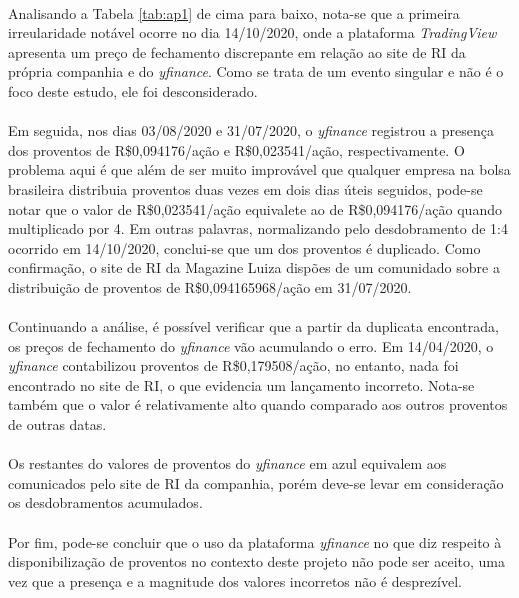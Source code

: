 \paragraph{} Analisando a Tabela \ref{tab:ap1} de cima para baixo, nota-se que a primeira irreularidade notável ocorre no dia 14/10/2020, onde a plataforma \textit{TradingView} apresenta um preço de fechamento discrepante em relação ao site de RI da própria companhia e do \textit{yfinance}. Como se trata de um evento singular e não é o foco deste estudo, ele foi desconsiderado.

\paragraph{} Em seguida, nos dias 03/08/2020 e 31/07/2020, o \textit{yfinance} registrou a presença dos proventos de R\$0,094176/ação e R\$0,023541/ação, respectivamente. O problema aqui é que além de ser muito improvável que qualquer empresa na bolsa brasileira distribuia proventos duas vezes em dois dias úteis seguidos, pode-se notar que o valor de R\$0,023541/ação equivalete ao de R\$0,094176/ação quando multiplicado por 4. Em outras palavras, normalizando pelo desdobramento de 1:4 ocorrido em 14/10/2020, conclui-se que um dos proventos é duplicado. Como confirmação, o site de RI da Magazine Luiza dispões de um comunidado sobre a distribuição de proventos de R\$0,094165968/ação em 31/07/2020.

\paragraph{} Continuando a análise, é possível verificar que a partir da duplicata encontrada, os preços de fechamento do \textit{yfinance} vão acumulando o erro. Em 14/04/2020, o \textit{yfinance} contabilizou proventos de R\$0,179508/ação, no entanto, nada foi encontrado no site de RI, o que evidencia um lançamento incorreto. Nota-se também que o valor é relativamente alto quando comparado aos outros proventos de outras datas.

\paragraph{} Os restantes do valores de proventos do \textit{yfinance} em azul equivalem aos comunicados pelo site de RI da companhia, porém deve-se levar em consideração os desdobramentos acumulados.

\paragraph{} Por fim, pode-se concluir que o uso da plataforma \textit{yfinance} no que diz respeito à disponibilização de proventos no contexto deste projeto não pode ser aceito, uma vez que a presença e a magnitude dos valores incorretos não é desprezível.


